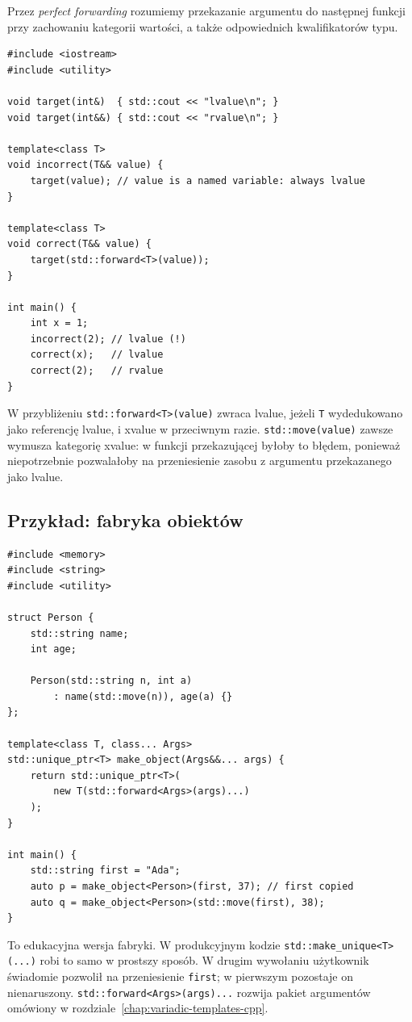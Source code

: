 Przez \emph{perfect forwarding} rozumiemy przekazanie argumentu
do następnej funkcji przy zachowaniu kategorii wartości,
a także odpowiednich kwalifikatorów typu.

\begin{lstlisting}
#include <iostream>
#include <utility>

void target(int&)  { std::cout << "lvalue\n"; }
void target(int&&) { std::cout << "rvalue\n"; }

template<class T>
void incorrect(T&& value) {
    target(value); // value is a named variable: always lvalue
}

template<class T>
void correct(T&& value) {
    target(std::forward<T>(value));
}

int main() {
    int x = 1;
    incorrect(2); // lvalue (!)
    correct(x);   // lvalue
    correct(2);   // rvalue
}
\end{lstlisting}

W przybliżeniu \texttt{std::forward<T>(value)} zwraca
lvalue, jeżeli \texttt{T} wydedukowano jako referencję lvalue,
i xvalue w przeciwnym razie. \texttt{std::move(value)} zawsze
wymusza kategorię xvalue: w funkcji przekazującej byłoby to
błędem, ponieważ niepotrzebnie pozwalałoby na przeniesienie
zasobu z argumentu przekazanego jako lvalue.

\subsection{Przykład: fabryka obiektów}

\begin{lstlisting}
#include <memory>
#include <string>
#include <utility>

struct Person {
    std::string name;
    int age;

    Person(std::string n, int a)
        : name(std::move(n)), age(a) {}
};

template<class T, class... Args>
std::unique_ptr<T> make_object(Args&&... args) {
    return std::unique_ptr<T>(
        new T(std::forward<Args>(args)...)
    );
}

int main() {
    std::string first = "Ada";
    auto p = make_object<Person>(first, 37); // first copied
    auto q = make_object<Person>(std::move(first), 38);
}
\end{lstlisting}

To edukacyjna wersja fabryki. W produkcyjnym kodzie
\texttt{std::make\_unique<T>(...)} robi to samo w prostszy
sposób. W drugim wywołaniu użytkownik świadomie pozwolił na
przeniesienie \texttt{first}; w pierwszym pozostaje on
nienaruszony. \texttt{std::forward<Args>(args)...} rozwija pakiet
argumentów omówiony w rozdziale~\ref{chap:variadic-templates-cpp}.

